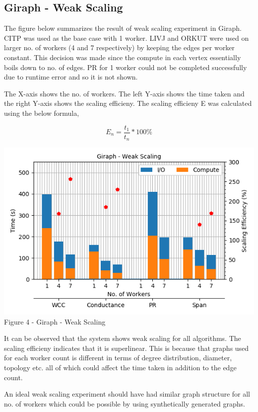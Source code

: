 \documentclass[11pt,a4paper,oneside]{article}
\begin{document}
    \subsection{Giraph - Weak Scaling}
    
    The figure below summarizes the result of weak scaling experiment in Giraph. CITP was used as the base case with 1 worker. LIVJ and ORKUT were used on larger no. of workers (4 and 7 respectively) by keeping the edges per worker constant. This decision was made since the compute in each vertex essentially boils down to no. of edges. PR for 1 worker could not be completed successfully due to runtime error and so it is not shown.
    
    The X-axis shows the no. of workers. The left Y-axis shows the time taken and the right Y-axis shows the scaling efficieny. The scaling efficieny E was calculated using the below formula,
    
    $$E_n = \frac{t_1}{t_n}*100\%$$

    \begin{center}
    	\includegraphics[scale=0.5]{4.png} \\
    	Figure 4 - Giraph - Weak Scaling	
    \end{center}

    It can be observed that the system shows weak scaling for all algorithms. The scaling efficieny indicates that it is superlinear. This is because that graphs used for each worker count is different in terms of degree distribution, diameter, topology etc. all of which could affect the time taken in addition to the edge count.
    
    An ideal weak scaling experiment should have had similar graph structure for all no. of workers which could be possible by using synthetically generated graphs.
    
\end{document}
